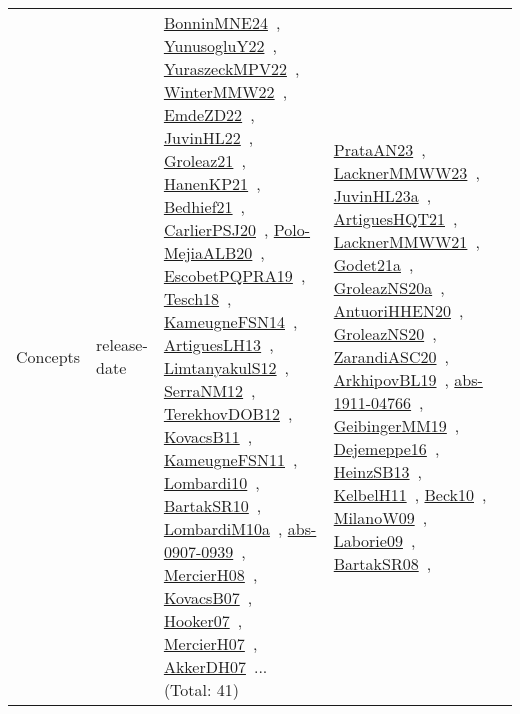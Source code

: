 {\begin{longtable}{lp{3cm}>{\raggedright\arraybackslash}p{6cm}>{\raggedright\arraybackslash}p{6cm}>{\raggedright\arraybackslash}p{8cm}}
Concepts & release-date & \href{../works/BonninMNE24.pdf}{BonninMNE24}~\cite{BonninMNE24}, \href{../works/YunusogluY22.pdf}{YunusogluY22}~\cite{YunusogluY22}, \href{../works/YuraszeckMPV22.pdf}{YuraszeckMPV22}~\cite{YuraszeckMPV22}, \href{../works/WinterMMW22.pdf}{WinterMMW22}~\cite{WinterMMW22}, \href{../works/EmdeZD22.pdf}{EmdeZD22}~\cite{EmdeZD22}, \href{../works/JuvinHL22.pdf}{JuvinHL22}~\cite{JuvinHL22}, \href{../works/Groleaz21.pdf}{Groleaz21}~\cite{Groleaz21}, \href{../works/HanenKP21.pdf}{HanenKP21}~\cite{HanenKP21}, \href{../works/Bedhief21.pdf}{Bedhief21}~\cite{Bedhief21}, \href{../works/CarlierPSJ20.pdf}{CarlierPSJ20}~\cite{CarlierPSJ20}, \href{../works/Polo-MejiaALB20.pdf}{Polo-MejiaALB20}~\cite{Polo-MejiaALB20}, \href{../works/EscobetPQPRA19.pdf}{EscobetPQPRA19}~\cite{EscobetPQPRA19}, \href{../works/Tesch18.pdf}{Tesch18}~\cite{Tesch18}, \href{../works/KameugneFSN14.pdf}{KameugneFSN14}~\cite{KameugneFSN14}, \href{../works/ArtiguesLH13.pdf}{ArtiguesLH13}~\cite{ArtiguesLH13}, \href{../works/LimtanyakulS12.pdf}{LimtanyakulS12}~\cite{LimtanyakulS12}, \href{../works/SerraNM12.pdf}{SerraNM12}~\cite{SerraNM12}, \href{../works/TerekhovDOB12.pdf}{TerekhovDOB12}~\cite{TerekhovDOB12}, \href{../works/KovacsB11.pdf}{KovacsB11}~\cite{KovacsB11}, \href{../works/KameugneFSN11.pdf}{KameugneFSN11}~\cite{KameugneFSN11}, \href{../works/Lombardi10.pdf}{Lombardi10}~\cite{Lombardi10}, \href{../works/BartakSR10.pdf}{BartakSR10}~\cite{BartakSR10}, \href{../works/LombardiM10a.pdf}{LombardiM10a}~\cite{LombardiM10a}, \href{../works/abs-0907-0939.pdf}{abs-0907-0939}~\cite{abs-0907-0939}, \href{../works/MercierH08.pdf}{MercierH08}~\cite{MercierH08}, \href{../works/KovacsB07.pdf}{KovacsB07}~\cite{KovacsB07}, \href{../works/Hooker07.pdf}{Hooker07}~\cite{Hooker07}, \href{../works/MercierH07.pdf}{MercierH07}~\cite{MercierH07}, \href{../works/AkkerDH07.pdf}{AkkerDH07}~\cite{AkkerDH07}... (Total: 41) & \href{../works/PrataAN23.pdf}{PrataAN23}~\cite{PrataAN23}, \href{../works/LacknerMMWW23.pdf}{LacknerMMWW23}~\cite{LacknerMMWW23}, \href{../works/JuvinHL23a.pdf}{JuvinHL23a}~\cite{JuvinHL23a}, \href{../works/ArtiguesHQT21.pdf}{ArtiguesHQT21}~\cite{ArtiguesHQT21}, \href{../works/LacknerMMWW21.pdf}{LacknerMMWW21}~\cite{LacknerMMWW21}, \href{../works/Godet21a.pdf}{Godet21a}~\cite{Godet21a}, \href{../works/GroleazNS20a.pdf}{GroleazNS20a}~\cite{GroleazNS20a}, \href{../works/AntuoriHHEN20.pdf}{AntuoriHHEN20}~\cite{AntuoriHHEN20}, \href{../works/GroleazNS20.pdf}{GroleazNS20}~\cite{GroleazNS20}, \href{../works/ZarandiASC20.pdf}{ZarandiASC20}~\cite{ZarandiASC20}, \href{../works/ArkhipovBL19.pdf}{ArkhipovBL19}~\cite{ArkhipovBL19}, \href{../works/abs-1911-04766.pdf}{abs-1911-04766}~\cite{abs-1911-04766}, \href{../works/GeibingerMM19.pdf}{GeibingerMM19}~\cite{GeibingerMM19}, \href{../works/Dejemeppe16.pdf}{Dejemeppe16}~\cite{Dejemeppe16}, \href{../works/HeinzSB13.pdf}{HeinzSB13}~\cite{HeinzSB13}, \href{../works/KelbelH11.pdf}{KelbelH11}~\cite{KelbelH11}, \href{../works/Beck10.pdf}{Beck10}~\cite{Beck10}, \href{../works/MilanoW09.pdf}{MilanoW09}~\cite{MilanoW09}, \href{../works/Laborie09.pdf}{Laborie09}~\cite{Laborie09}, \href{../works/BartakSR08.pdf}{BartakSR08}~\cite{BartakSR08}, 
\end{longtable}}
